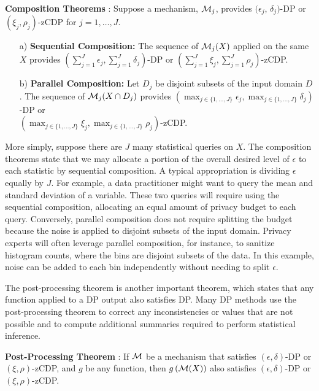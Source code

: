 \begin{thm}\label{thm:comp} \textbf{Composition Theorems} \citep{mcsherry2009privacy,dwork2016concentrated,bun2016concentrated}:
Suppose a mechanism, $\mathcal{M}_j$, provides $(\epsilon_j$, $\delta_j)$-DP or $(\xi_j,\rho_j)$-zCDP for $j=1,\ldots,J$.
  \begin{itemize}\setlength{\itemindent}{15pt}
  \item[a)] \textbf{Sequential Composition:} The sequence of $\mathcal{M}_j(X)$ applied on the same $X$ provides $(\sum_{j=1}^J\epsilon_j,\sum_{j=1}^J\delta_j)$-DP or $(\sum_{j=1}^J\xi_j,\sum_{j=1}^J\rho_j)$-zCDP.
  \item[b)] \textbf{Parallel Composition:} Let  $D_j$ be disjoint subsets of the input domain $D$. The sequence of $\mathcal{M}_j(X\cap D_j)$ provides $(\max_{j \in \{1,\ldots,J\}} \epsilon_j, \max_{j \in \{1,\ldots,J\}} \delta_j)$-DP or \\ $(\max_{j \in \{1,\ldots,J\}}\xi_j, \max_{j \in \{1,\ldots,J\}}\rho_j)$-zCDP.
  \end{itemize}
\end{thm}
\vspace{-8pt}
More simply, suppose there are $J$ many statistical queries on $X$. The composition theorems state that we may allocate a portion of the overall desired level of $\epsilon$ to each statistic by sequential composition. A typical appropriation is dividing $\epsilon$ equally by $J$. For example, a data practitioner might want to query the mean and standard deviation of a variable. These two queries will require using the sequential composition, allocating an equal amount of privacy budget to each query. Conversely, parallel composition does not require splitting the budget because the noise is applied to disjoint subsets of the input domain. Privacy experts will often leverage parallel composition, for instance, to sanitize histogram counts, where the bins are disjoint subsets of the data. In this example, noise can be added to each bin independently without needing to split $\epsilon$.

The post-processing theorem is another important theorem, which states that any function applied to a DP output also satisfies DP. Many DP methods use the post-processing theorem to correct any inconsistencies or values that are not possible and to compute additional summaries required to perform statistical inference.

\begin{thm}\label{thm:post} \textbf{Post-Processing Theorem} \citep{dwork2006calibrating,nissim2007smooth, bun2016concentrated}:
If $\mathcal{M}$ be a mechanism that satisfies $(\epsilon,\delta)$-DP or $(\xi,\rho)$-zCDP, and $g$ be any function, then $g\left(\mathcal{M}(X)\right)$ also satisfies $(\epsilon,\delta)$-DP or $(\xi,\rho)$-zCDP.
\end{thm}

